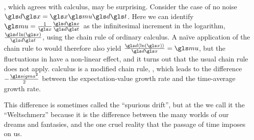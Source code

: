 , which agrees with \Ito calculus, may be surprising.
Consider the case of no noise $\gd\x=\x \gmu \gd\t$. Here we can identify $\gmu=\frac{1}{\x}\frac{\gd\x}{\gd\t}$ 
as the infinitesimal increment in the logarithm, $\frac{\gd \ln(\x)}{\gd\t}$, using the chain rule of ordinary calculus. 
A na\"ive application of the chain rule to  would therefore also yield $\frac{\gd \ave{\ln(\x)}}{\gd\x}=\gmu$, 
but the fluctuations in \GBM have a non-linear effect, and it turns out that the usual chain rule does not apply. \Ito
calculus is a modified chain rule, , which leads to the difference $-\frac{\gsigma^2}{2}$ between the 
expectation-value growth rate and the time-average
growth rate. 

This difference is sometimes called the ``spurious drift'', but at the \LML we call it the ``Weltschmerz'' because 
it is the difference between the many worlds of our dreams and fantasies, and the one cruel reality that 
the passage of time imposes on us.

